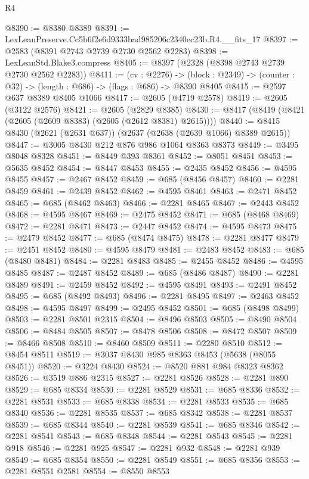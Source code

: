 \begin{lexlean}{R4}
\begin{coremodule}
@8390 := @8380 @8389
@8391 := LexLeanPreserve.Cc5b6f2e6d9333bad985206c2340ec23b.R4.__fits_17
@8397 := @2583 (@8391 @2743 @2739 @2730 @2562 @2283)
@8398 := LexLeanStd.Blake3.compress
@8405 := @8397 (@2328 (@8398 @2743 @2739 @2730 @2562 @2283))
@8411 := (cv : @2276) ->
  (block : @2349) -> (counter : @32) -> (length : @686) -> (flags : @686) -> @8390 @8405
@8415 := @2597 @637 @8389 @8405 @1066
@8417 := @2605 (@4719 @2578)
@8419 := @2605 (@3122 @2576)
@8421 := @2605 (@2829 @8385)
@8430 := @8417 (@8419 (@8421 (@2605 (@2609 @8383) (@2605 (@2612 @8381) @2615))))
@8440 := @8415 @8430 (@2621 (@2631 @637)) (@2637 (@2638 (@2639 @1066) @8389 @2615))
@8447 := @3005 @8430 @212 @876 @986 @1064 @8363 @8373
@8449 := @3495 @8048 @8328
@8451 := @8449 @393 @8361
@8452 := @8051 @8451
@8453 := @5635 @8452
@8454 := @8447 @8453
@8455 := @2435 @8452
@8456 := @4595 @8455
@8457 := @2467 @8452
@8459 := @685 (@8456 @8457)
@8460 := @2281 @8459
@8461 := @2439 @8452
@8462 := @4595 @8461
@8463 := @2471 @8452
@8465 := @685 (@8462 @8463)
@8466 := @2281 @8465
@8467 := @2443 @8452
@8468 := @4595 @8467
@8469 := @2475 @8452
@8471 := @685 (@8468 @8469)
@8472 := @2281 @8471
@8473 := @2447 @8452
@8474 := @4595 @8473
@8475 := @2479 @8452
@8477 := @685 (@8474 @8475)
@8478 := @2281 @8477
@8479 := @2451 @8452
@8480 := @4595 @8479
@8481 := @2483 @8452
@8483 := @685 (@8480 @8481)
@8484 := @2281 @8483
@8485 := @2455 @8452
@8486 := @4595 @8485
@8487 := @2487 @8452
@8489 := @685 (@8486 @8487)
@8490 := @2281 @8489
@8491 := @2459 @8452
@8492 := @4595 @8491
@8493 := @2491 @8452
@8495 := @685 (@8492 @8493)
@8496 := @2281 @8495
@8497 := @2463 @8452
@8498 := @4595 @8497
@8499 := @2495 @8452
@8501 := @685 (@8498 @8499)
@8503 := @2281 @8501 @2315
@8504 := @8496 @8503
@8505 := @8490 @8504
@8506 := @8484 @8505
@8507 := @8478 @8506
@8508 := @8472 @8507
@8509 := @8466 @8508
@8510 := @8460 @8509
@8511 := @2280 @8510
@8512 := @8454 @8511
@8519 := @3037 @8430 @985 @8363 @8453 (@5638 (@8055 @8451))
@8520 := @3224 @8430
@8524 := @8520 @881 @984 @8323 @8362
@8526 := @3519 @886 @2315
@8527 := @2281 @8526
@8528 := @2281 @890
@8529 := @685 @8334
@8530 := @2281 @8529
@8531 := @685 @8336
@8532 := @2281 @8531
@8533 := @685 @8338
@8534 := @2281 @8533
@8535 := @685 @8340
@8536 := @2281 @8535
@8537 := @685 @8342
@8538 := @2281 @8537
@8539 := @685 @8344
@8540 := @2281 @8539
@8541 := @685 @8346
@8542 := @2281 @8541
@8543 := @685 @8348
@8544 := @2281 @8543
@8545 := @2281 @918
@8546 := @2281 @925
@8547 := @2281 @932
@8548 := @2281 @939
@8549 := @685 @8354
@8550 := @2281 @8549
@8551 := @685 @8356
@8553 := @2281 @8551 @2581
@8554 := @8550 @8553

\end{coremodule}
\end{lexlean}
